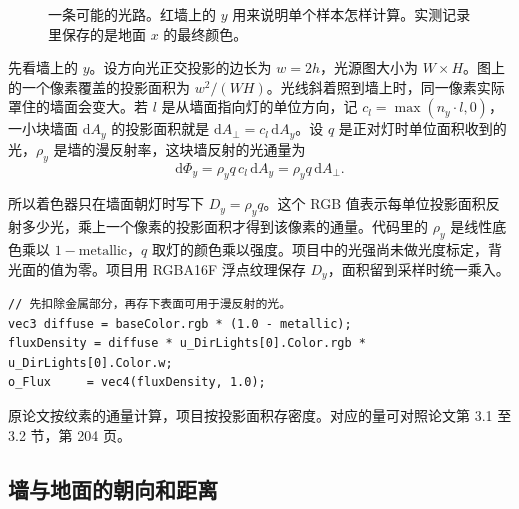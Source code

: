 \begin{figure}[H]\centering
{}
\caption{一条可能的光路。红墙上的 $y$ 用来说明单个样本怎样计算。实测记录里保存的是地面 $x$ 的最终颜色。}
\end{figure}

先看墙上的 $y$。设方向光正交投影的边长为 $w=2h$，光源图大小为 $W\times H$。图上的一个像素覆盖的投影面积为 $w^2/(WH)$。光线斜着照到墙上时，同一像素实际罩住的墙面会变大。若 $l$ 是从墙面指向灯的单位方向，记 $c_l=\max(n_y\cdot l,0)$，一小块墙面 $\mathrm dA_y$ 的投影面积就是 $\mathrm dA_\perp=c_l\,\mathrm dA_y$。设 $q$ 是正对灯时单位面积收到的光，$\rho_y$ 是墙的漫反射率，这块墙反射的光通量为
\[
 \mathrm d\Phi_y=\rho_y q\,c_l\,\mathrm dA_y=\rho_y q\,\mathrm dA_\perp.
\]

所以着色器只在墙面朝灯时写下 $D_y=\rho_y q$。这个 RGB 值表示每单位投影面积反射多少光，乘上一个像素的投影面积才得到该像素的通量。代码里的 $\rho_y$ 是线性底色乘以 $1-\mathrm{metallic}$，$q$ 取灯的颜色乘以强度。项目中的光强尚未做光度标定，背光面的值为零。项目用 RGBA16F 浮点纹理保存 $D_y$，面积留到采样时统一乘入。

\begin{lstlisting}
// 先扣除金属部分，再存下表面可用于漫反射的光。
vec3 diffuse = baseColor.rgb * (1.0 - metallic);
fluxDensity = diffuse * u_DirLights[0].Color.rgb * u_DirLights[0].Color.w;
o_Flux     = vec4(fluxDensity, 1.0);
\end{lstlisting}
原论文按纹素的通量计算，项目按投影面积存密度。对应的量可对照论文第 3.1 至 3.2 节，第 204 页。

\newpage
\subsection{墙与地面的朝向和距离}

